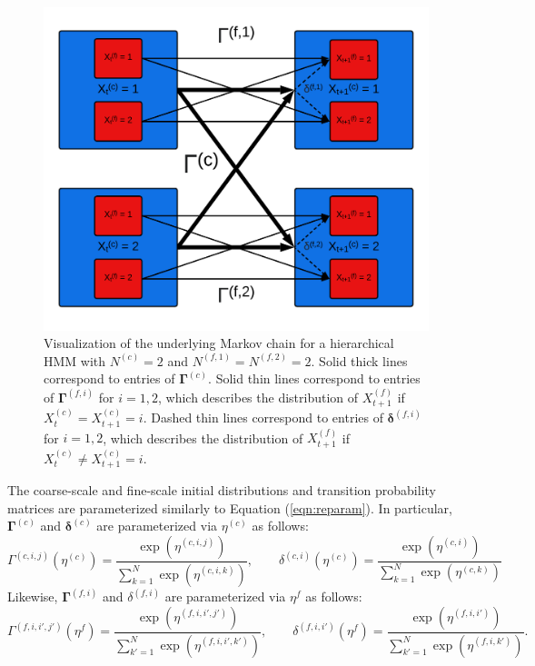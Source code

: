 \begin{figure}
    \centering
    \includegraphics{plt/HHMM.png}
    \caption{Visualization of the underlying Markov chain for a hierarchical HMM with $N^{(c)} = 2$ and $N^{(f,1)} = N^{(f,2)} = 2$. Solid thick lines correspond to entries of $\boldsymbol{\Gamma}^{(c)}$. Solid thin lines correspond to entries of $\boldsymbol{\Gamma}^{(f,i)}$ for $i = 1,2$, which describes the distribution of $X_{t+1}^{(f)}$ if $X^{(c)}_{t} = X^{(c)}_{t+1} = i$. Dashed thin lines correspond to entries of $\boldsymbol{\delta}^{(f,i)}$ for $i = 1,2$, which describes the distribution of $X_{t+1}^{(f)}$ if $X^{(c)}_{t} \neq X^{(c)}_{t+1} = i$.}
    \label{fig:HHMM}
\end{figure}

The coarse-scale and fine-scale initial distributions and transition probability matrices are parameterized similarly to Equation (\ref{eqn:reparam}). In particular, $\boldsymbol{\Gamma}^{(c)}$ and $\boldsymbol{\delta}^{(c)}$ are parameterized via $\eta^{(c)}$ as follows:
%
\begin{equation}
    \Gamma^{(c,i,j)}(\eta^{(c)}) = \frac{\exp(\eta^{(c,i,j)})}{\sum_{k=1}^N \exp(\eta^{(c,i,k)})}, \qquad \delta^{(c,i)}(\eta^{(c)}) = \frac{\exp(\eta^{(c,i)})}{\sum_{k=1}^N \exp(\eta^{(c,k)})}
    \label{eqn:reparam_coarse}
\end{equation}
%
Likewise, $\boldsymbol{\Gamma}^{(f,i)}$ and $\delta^{(f,i)}$ are parameterized via $\eta^f$ as follows:
%
\begin{equation}
    \Gamma^{(f,i,i',j')}(\eta^f) = \frac{\exp(\eta^{(f,i,i',j')})}{\sum_{k'=1}^N \exp(\eta^{(f,i,i',k')})}, \qquad \delta^{(f,i,i')}(\eta^{f}) = \frac{\exp(\eta^{(f,i,i')})}{\sum_{k'=1}^N \exp(\eta^{(f,i,k')})}.
    \label{eqn:reparam_fine}
\end{equation}


